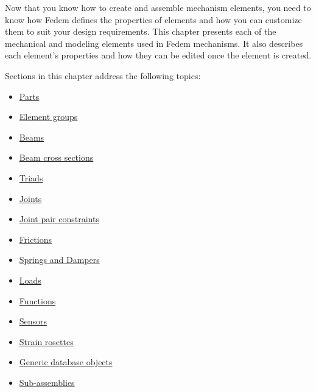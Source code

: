 %
%

%
%

\def\RightFigure#1#2{\noindent
  \begin{minipage}{0.65\textwidth}
    \raggedright#2
  \end{minipage}%
  \hfill\begin{minipage}{0.25\textwidth}
    \texttt{[image: Figures/\#1]}
  \end{minipage}}

\def\Hline#1{\put(0,0){\line(1,0){#1}}}
\def\Vline#1{\put(0,0){\line(0,1){#1}}}



Now that you know how to create and assemble
mechanism elements, you need to
know how Fedem defines the properties of elements and how you can
customize them to suit your design requirements. This chapter presents
each of the mechanical and modeling elements used in Fedem mechanisms.
It also describes each element's properties and how they can be edited
once the element is created.

Sections in this chapter address the following topics:

\begin{itemize}
\item
  \protect\hyperlink{parts}{Parts}
\item
  \protect\hyperlink{element-groups}{Element groups}
\item
  \protect\hyperlink{beams}{Beams}
\item
  \protect\hyperlink{beam-cross-sections}{Beam cross sections}
\item
  \protect\hyperlink{triads}{Triads}
\item
  \protect\hyperlink{joints}{Joints}
\item
  \protect\hyperlink{joint-pair-constraints}{Joint pair constraints}
\item
  \protect\hyperlink{frictions}{Frictions}
\item
  \protect\hyperlink{springs-and-dampers}{Springs and Dampers}
\item
  \protect\hyperlink{loads}{Loads}
\item
  \protect\hyperlink{functions}{Functions}
\item
  \protect\hyperlink{sensors}{Sensors}
\item
  \protect\hyperlink{strain-rosettes}{Strain rosettes}
\item
  \protect\hyperlink{generic-database-objects}{Generic database objects}
\item
  \protect\hyperlink{sub-assemblies}{Sub-assemblies}
\end{itemize}

